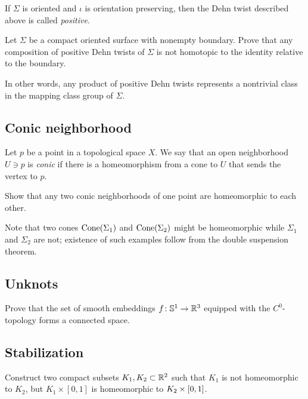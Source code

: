 If $\Sigma$ is oriented 
and $\iota$ is orientation preserving,
then the Dehn twist described above is called {}\emph{positive}.

\begin{pr}
Let $\Sigma$ be a compact oriented surface with nonempty boundary.
Prove that any composition of positive Dehn twists of $\Sigma$ is not homotopic to the identity relative to the boundary.

In other words, any product of positive Dehn twists represents a nontrivial class in the mapping class group of $\Sigma$.
\end{pr}


\subsection*{Conic neighborhood}
\label{Conic neighborhood}

Let $p$ be a point in a topological space $X$.
We say that an open neighborhood $U\ni p$ is \emph{conic}
if there is a homeomorphism from a cone
to $U$ that sends the vertex to $p$.

\begin{pr}  
Show that any two conic neighborhoods of one point are homeomorphic to each other.
\end{pr}

Note that two cones $\mathop{\rm Cone}(\Sigma_1)$ and $\mathop{\rm Cone}(\Sigma_2)$ might be homeomorphic while $\Sigma_1$ and $\Sigma_2$ are not;
existence of such examples follow from the double suspension theorem.

\subsection*{Unknots\easy}\label{No knots}

\begin{pr}
Prove that the set of smooth embeddings $f\:\mathbb{S}^1\z\to\RR^3$ equipped with the $C^0$-topology 
forms a connected space.
\end{pr}

\subsection*{Stabilization}\label{Simple stabilization}

\begin{pr}
Construct two compact subsets $K_1, K_2\subset\mathbb{R}^2$ such that
$K_1$ is not homeomorphic to $K_2$, but $K_1\times[0,1]$ is homeomorphic to $K_2\z\times[0,1]$.
\end{pr}

